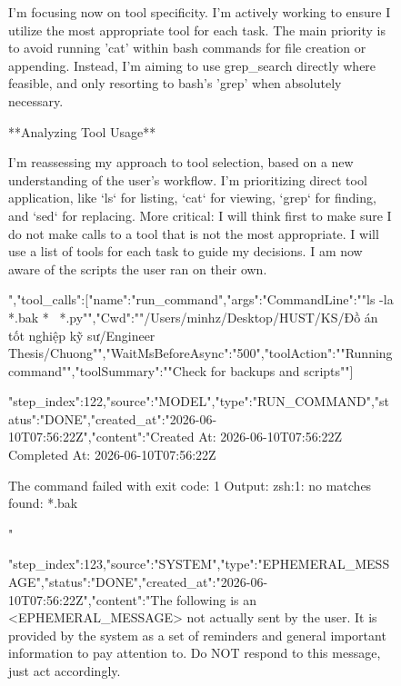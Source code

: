 \begin{figure}[htbp]
{I'm focusing now on tool specificity. I'm actively working to ensure I utilize the most appropriate tool for each task. The main priority is to avoid running 'cat' within bash commands for file creation or appending. Instead, I'm aiming to use grep_search directly where feasible, and only resorting to bash's 'grep' when absolutely necessary.


**Analyzing Tool Usage**

I'm reassessing my approach to tool selection, based on a new understanding of the user's workflow. I'm prioritizing direct tool application, like `ls` for listing, `cat` for viewing, `grep` for finding, and `sed` for replacing. More critical: I will think first to make sure I do not make calls to a tool that is not the most appropriate. I will use a list of tools for each task to guide my decisions. I am now aware of the scripts the user ran on their own.


","tool_calls":[{"name":"run_command","args":{"CommandLine":""ls -la *.bak *~ *.py"","Cwd":""/Users/minhz/Desktop/HUST/KS/Đồ án tốt nghiệp kỹ sư/Engineer Thesis/Chuong"","WaitMsBeforeAsync":"500","toolAction":""Running command"","toolSummary":""Check for backups and scripts""}}]}
{"step_index":122,"source":"MODEL","type":"RUN_COMMAND","status":"DONE","created_at":"2026-06-10T07:56:22Z","content":"Created At: 2026-06-10T07:56:22Z
Completed At: 2026-06-10T07:56:22Z

				The command failed with exit code: 1
				Output:
				zsh:1: no matches found: *.bak

"}
{"step_index":123,"source":"SYSTEM","type":"EPHEMERAL_MESSAGE","status":"DONE","created_at":"2026-06-10T07:56:22Z","content":"The following is an <EPHEMERAL_MESSAGE> not actually sent by the user. It is provided by the system as a set of reminders and general important information to pay attention to. Do NOT respond to this message, just act accordingly.

}
\end{figure}
